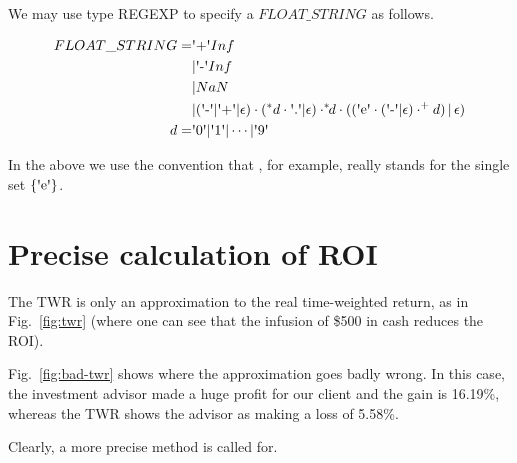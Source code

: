 \documentclass[runningheads,12pt]{article}
\begin{document}
We may use type REGEXP to specify a $FLOAT\_STRING$ as follows.

\begin{align}
FLOAT\_STRING = &\squote{+}Inf\\
&|\squote{-}Inf\\
&|NaN\\
&|(\squote{-}|\squote{+}|\epsilon)\cdot(^*d\cdot\squote{.}|\epsilon)\cdot
	^*\!\!d\cdot ((\squote{e}\cdot(\squote{-}|\epsilon)\cdot^\textrm{+}d)\,|\,\epsilon)\\
d = &\squote{0} | \squote{1} | \cdots |\squote{9} 
\end{align}

In the above we use the convention that , for example, really stands for the single set $\{\squote{e}\}$.



\section{Precise calculation of ROI}

The TWR is only an approximation to the real time-weighted return, as in  Fig.~\ref{fig:twr} (where one can see that the infusion of \$500 in cash reduces the ROI). 

Fig.~\ref{fig:bad-twr} shows where the approximation goes badly wrong. In this case, the investment advisor made a huge profit for our client and the gain is 16.19\%, whereas the TWR shows the advisor as making a loss of 5.58\%.

Clearly, a more precise method is called for. 
\end{document}
